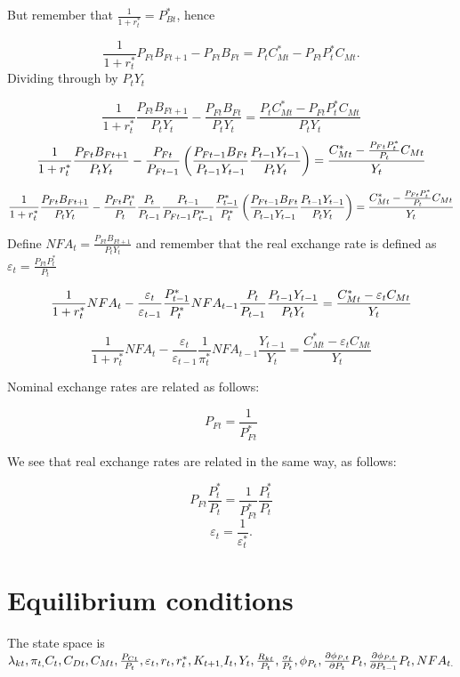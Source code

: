 \documentclass{article}
\begin{document}
But remember that $\frac{1}{1+r_{t}^{\ast }}=P_{Bt}^{\ast }$, hence

\bigskip 
\[
\frac{1}{1+r_{t}^{\ast }}P_{Ft}B_{Ft+1}-P_{Ft}B_{Ft}=P_{t}C_{Mt}^{\ast
}-P_{Ft}P_{t}^{\ast }C_{Mt}. 
\]%
Dividing through by $P_{t}Y_{t}$

\[
\frac{1}{1+r_{t}^{\ast }}\frac{P_{Ft}B_{Ft+1}}{P_{t}Y_{t}}-\frac{P_{Ft}B_{Ft}%
}{P_{t}Y_{t}}=\frac{P_{t}C_{Mt}^{\ast }-P_{Ft}P_{t}^{\ast }C_{Mt}}{P_{t}Y_{t}%
}
\]%
\[
\frac{1}{1+r_{t}^{\ast }}\frac{P_{Ft}B_{Ft+1}}{P_{t}Y_{t}}-\frac{P_{Ft}}{%
P_{Ft-1}}\left( \frac{P_{Ft-1}B_{Ft}}{P_{t-1}Y_{t-1}}\frac{P_{t-1}Y_{t-1}}{%
P_{t}Y_{t}}\right) =\frac{C_{Mt}^{\ast }-\frac{P_{Ft}P_{t}^{\ast }}{P_{t}}%
C_{Mt}}{Y_{t}}
\]

\[
\frac{1}{1+r_{t}^{\ast }}\frac{P_{Ft}B_{Ft+1}}{P_{t}Y_{t}}-\frac{%
P_{Ft}P_{t}^{\ast }}{P_{t}}\frac{P_{t}}{P_{t-1}}\frac{P_{t-1}}{%
P_{Ft-1}P_{t-1}^{\ast }}\frac{P_{t-1}^{\ast }}{P_{t}^{\ast }}\left( \frac{%
P_{Ft-1}B_{Ft}}{P_{t-1}Y_{t-1}}\frac{P_{t-1}Y_{t-1}}{P_{t}Y_{t}}\right) =%
\frac{C_{Mt}^{\ast }-\frac{P_{Ft}P_{t}^{\ast }}{P_{t}}C_{Mt}}{Y_{t}} 
\]

Define $NFA_{t}=\frac{P_{Ft}B_{Ft+1}}{P_{t}Y_{t}}$ and remember that the
real exchange rate is defined as $\varepsilon _{t}=\frac{P_{Ft}P_{t}^{\ast }%
}{P_{t}}$

\[
\frac{1}{1+r_{t}^{\ast }}NFA_{t}-\frac{\varepsilon _{t}}{\varepsilon _{t-1}}%
\frac{P_{t-1}^{\ast }}{P_{t}^{\ast }}NFA_{t-1}\frac{P_{t}}{P_{t-1}}\frac{%
P_{t-1}Y_{t-1}}{P_{t}Y_{t}}=\frac{C_{Mt}^{\ast }-\varepsilon _{t}C_{Mt}}{%
Y_{t}} 
\]

\[
\frac{1}{1+r_{t}^{\ast }}NFA_{t}-\frac{\varepsilon _{t}}{\varepsilon _{t-1}}%
\frac{1}{\pi _{t}^{\ast }}NFA_{t-1}\frac{Y_{t-1}}{Y_{t}}=\frac{C_{Mt}^{\ast
}-\varepsilon _{t}C_{Mt}}{Y_{t}} 
\]

Nominal exchange rates are related as follows:

\[
P_{Ft}=\frac{1}{P_{Ft}^{\ast }} 
\]

We see that real exchange rates are related in the same way, as follows:

\[
P_{Ft}\frac{P_{t}^{\ast }}{P_{t}}=\frac{1}{P_{Ft}^{\ast }}\frac{P_{t}^{\ast }%
}{P_{t}} 
\]%
\[
\varepsilon _{t}=\frac{1}{\varepsilon _{t}^{\ast }}. 
\]

\section{Equilibrium conditions}

The state space is $\lambda _{kt},\pi _{t,}C_{t},C_{Dt},C_{Mt},\frac{P_{Ct}}{%
P_{t}},\varepsilon _{t},r_{t},r_{t}^{\ast },K_{t+1,}I_{t},Y_{t},\frac{R_{kt}%
}{P_{t}},\frac{\sigma _{t}}{P_{t}},\phi _{P_{t}},\frac{\partial \phi _{P,t}}{%
\partial P_{t}}P_{t},\frac{\partial \phi _{P,t}}{\partial P_{t-1}}%
P_{t},NFA_{t.}$
\end{document}

